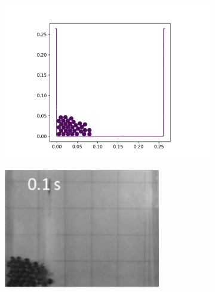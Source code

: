 \begin{figure}[!htpb]
  \begin{subfigure}{0.48\textwidth}
    \centering
    \includegraphics[width=1.0\textwidth]{figures/rfc/figures/stack_of_cylinders_2d/Mohseni_Vyas/time1}
  \end{subfigure}
  \begin{subfigure}{0.48\textwidth}
    \centering
    \includegraphics[width=0.75\textwidth]{images/rfc/images/stack_of_cylinders_experimental_images/time1}
  \end{subfigure}


\end{figure}
